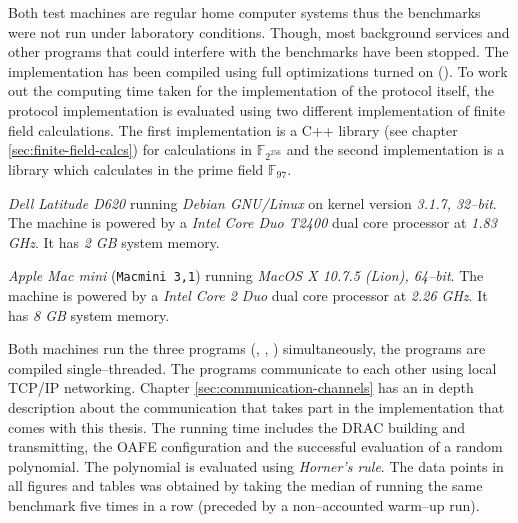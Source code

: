 \label{sec:evaluation}

%
%
\label{sec:test-setup}

\label{sec:test-machines}

Both test machines are regular home computer systems thus the benchmarks were
not run under laboratory conditions. Though, most background services and other
programs that could interfere with the benchmarks have been stopped. The
implementation has been compiled using full optimizations turned on
(). To work out the computing time
taken for the implementation of the protocol itself, the protocol implementation
is evaluated using two different implementation of finite field calculations.
The first implementation is a C++ library (see chapter
\ref{sec:finite-field-calcs}) for calculations in $\mathbb{F}_{2^{256}}$ and the
second implementation is a \JWThaskell{} library which calculates in the prime
field $\mathbb{F}_{97}$.



\emph{Dell Latitude D620} running \emph{Debian GNU/Linux} on kernel version
\emph{3.1.7, 32--bit}. The machine is powered by a \emph{Intel\TReg{} Core Duo
T2400} dual core processor at \emph{1.83 GHz}. It has \emph{2 GB} system memory.



\emph{Apple Mac mini} (\texttt{Macmini 3,1}) running \emph{MacOS X 10.7.5
(Lion), 64--bit}. The machine is powered by a \emph{Intel\TReg{} Core 2 Duo}
dual core processor at \emph{2.26 GHz}. It has \emph{8 GB} system memory.


Both machines run the three programs (\JWBpOne{}, \JWBpTwo{}, \JWBtoken{})
simultaneously, the programs are compiled single--threaded. The programs
communicate to each other using local TCP/IP networking. Chapter
\ref{sec:communication-channels} has an in depth description about the
communication that takes part in the implementation that comes with this thesis.
The running time includes the DRAC building and transmitting, the OAFE
configuration and the successful evaluation of a random polynomial. The
polynomial is evaluated using \emph{Horner's rule}\cite{cormen01}. The data
points in all figures and tables was obtained by taking the median of
running the same benchmark five times in a row (preceded by a non--accounted
warm--up run).


